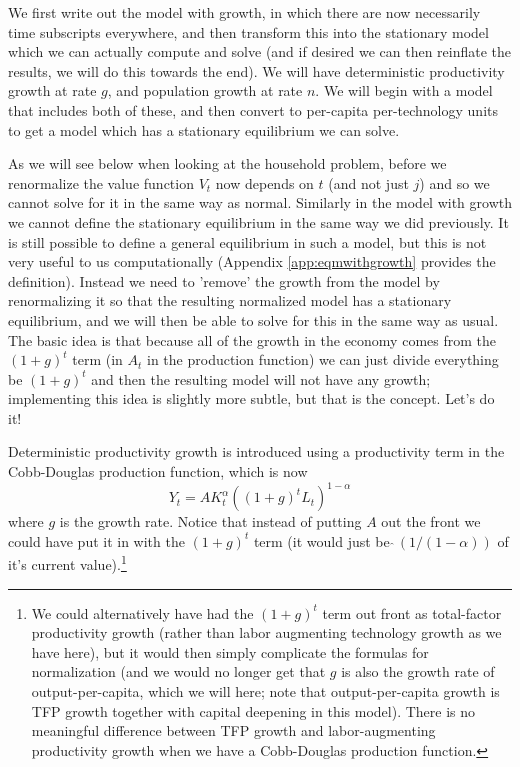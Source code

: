 We first write out the model with growth, in which there are now necessarily time subscripts everywhere, and then transform this into the stationary model which we can actually compute and solve (and if desired we can then reinflate the results, we will do this towards the end). We will have deterministic productivity growth at rate $g$, and population growth at rate $n$. We will begin with a model that includes both of these, and then convert to per-capita per-technology units to get a model which has a stationary equilibrium we can solve.

As we will see below when looking at the household problem, before we renormalize the value function $V_t$ now depends on $t$ (and not just $j$) and so we cannot solve for it in the same way as normal. Similarly in the model with growth we cannot define the stationary equilibrium in the same way we did previously. It is still possible to define a general equilibrium in such a model, but this is not very useful to us computationally (Appendix \ref{app:eqmwithgrowth} provides the definition). Instead we need to 'remove' the growth from the model by renormalizing it so that the resulting normalized model has a stationary equilibrium, and we will then be able to solve for this in the same way as usual. The basic idea is that because all of the growth in the economy comes from the $(1+g)^t$ term (in $A_t$ in the production function) we can just divide everything be $(1+g)^t$ and then the resulting model will not have any growth; implementing this idea is slightly more subtle, but that is the concept. Let's do it!

Deterministic productivity growth is introduced using a productivity term in the Cobb-Douglas production function, which is now
\begin{equation*}
 Y_t=A K_t^{\alpha} ((1+g)^t L_t)^{1-\alpha}
\end{equation*}
where $g$ is the growth rate. Notice that instead of putting $A$ out the front we could have put it in with the $(1+g)^t$ term (it would just be $\hat{} \,( 1/(1-\alpha))$ of it's current value).\footnote{We could alternatively have had the $(1+g)^t$ term out front as total-factor productivity growth (rather than labor augmenting technology growth as we have here), but it would then simply complicate the formulas for normalization (and we would no longer get that $g$ is also the growth rate of output-per-capita, which we will here; note that output-per-capita growth is TFP growth together with capital deepening in this model). There is no meaningful difference between TFP growth and labor-augmenting productivity growth when we have a Cobb-Douglas production function.}

